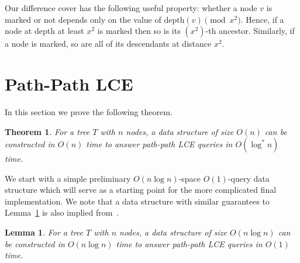 \documentclass [10pt]{article}
\newtheorem{lemma}{Lemma}
\newtheorem{theorem}{Theorem}
\newcommand{\depth}{\ensuremath{\mathrm{depth}}}
\begin{document}
 Our difference cover has the following useful property: whether a node $v$ is marked or not depends only on
the value of $\depth(v) \pmod{x^{2}}$. Hence, if a node at depth at least $x^{2}$ is marked then so is its $(x^{2})$-th ancestor. Similarly, if
a node is marked, so are all of its descendants at distance $x^{2}$.

\section{Path-Path LCE} 
\label{sec:path-path}

In this section we prove the following theorem.

\begin{theorem}\label{thm:lcepp}
For a tree $T$ with $n$ nodes, a data structure of size $O(n)$ can be constructed in $O(n)$ time to answer path-path LCE queries in
$O(\log^{*} n)$ time. 
\end{theorem}

We start with a simple preliminary $O(n\log n)$-space $O(1)$-query data structure which will serve as a starting point for the more complicated final implementation. We note that a data structure with similar guarantees to Lemma~\ref{lem:simple path-path} is also implied from~\cite{Bannai2013}.



\begin{lemma}
For a tree $T$ with $n$ nodes, a data structure of size $O(n\log n)$ can be constructed in $O(n\log n)$ time to answer path-path LCE queries in
$O(1)$ time.
\label{lem:simple path-path}
\end{lemma}
\end{document}
